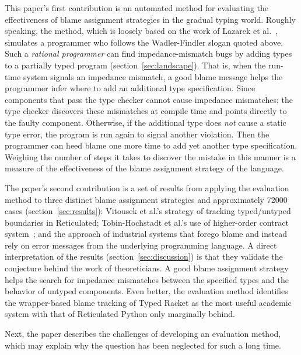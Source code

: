 This paper's first contribution is an automated method for evaluating the
effectiveness of blame assignment strategies in the gradual typing world.
Roughly speaking, the method, which is
loosely based on the work of Lazarek et al.~\cite{lksfd-popl-2020},
simulates a programmer who follows the Wadler-Findler slogan quoted above.
Such a \emph{rational programmer} can find impedance-mismatch
bugs by adding types to a partially typed program (section~\ref{sec:landscape}). That is, when the
run-time system signals an impedance mismatch, a good blame message helps
the programmer infer where to add an additional type specification. Since
components that pass the type checker cannot cause impedance mismatches;
the type checker discovers these mismatches at compile time and points
directly to the faulty component. Otherwise, if the
additional type does {\em not\/} cause a static type error, the program
 is run again to signal another violation. Then the programmer can heed
blame one more time to add yet another type specification. Weighing the number of
steps it takes to discover the mistake in this manner is a measure of the effectiveness
of the blame assignment strategy of the language.

The paper's second contribution is a set of results from applying the evaluation
method to three distinct blame assignment strategies and approximately
72000 cases (section~\ref{sec:results}): Vitousek et
al.'s strategy of tracking typed/untyped boundaries in Reticulated;
Tobin-Hochstadt et al.'s use of higher-order contract system~\cite{ff-icfp-2002,
mf-toplas-2009}; and the approach of industrial systems that forego blame
and instead rely on error messages from the
underlying programming language. A direct interpretation of the results
(section~\ref{sec:discussion}) is that
they validate the conjecture behind the work of theoreticians. A good blame assignment
strategy helps the search for impedance mismatches between the specified types
and the behavior of untyped components. Even better, the evaluation method 
identifies the wrapper-based blame tracking of Typed Racket as the most
useful academic system with that of Reticulated Python only marginally  behind.

Next, the paper describes the challenges of developing an evaluation
method, which may explain why the question has been neglected for such
a long time.


